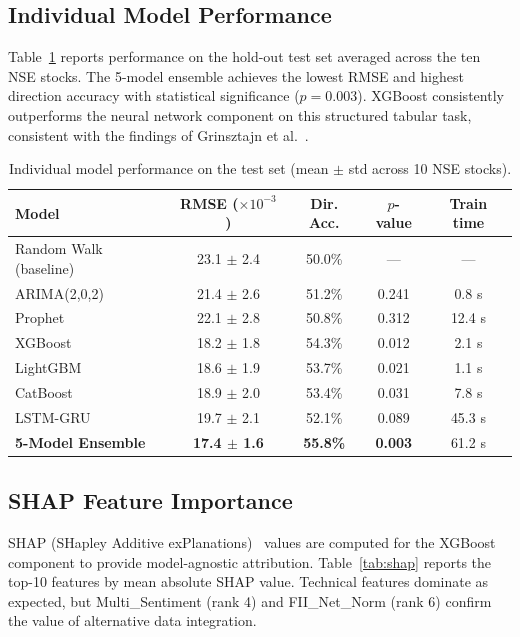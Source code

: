 \documentclass[10pt,a4paper,twoside]{article}
\begin{document}
\subsection{Individual Model Performance}

Table~\ref{tab:model_perf} reports performance on the hold-out test set averaged
across the ten NSE stocks. The 5-model ensemble achieves the lowest RMSE and
highest direction accuracy with statistical significance ($p = 0.003$). XGBoost
consistently outperforms the neural network component on this structured tabular
task, consistent with the findings of Grinsztajn et al.~\cite{grinsztajn2022}.

\begin{table}[htb]
  \begin{center}
    {\caption{Individual model performance on the test set (mean $\pm$ std across
    10 NSE stocks).}\label{tab:model_perf}}
    \begin{tabular}{|l|c|c|c|c|}
    \hline
    \textbf{Model} & \textbf{RMSE ($\times 10^{-3}$)} & \textbf{Dir. Acc.} & \textbf{$p$-value} & \textbf{Train time} \\
    \hline
    Random Walk (baseline) & 23.1 $\pm$ 2.4 & 50.0\% & --- & --- \\
    ARIMA(2,0,2) & 21.4 $\pm$ 2.6 & 51.2\% & 0.241 & 0.8 s \\
    Prophet & 22.1 $\pm$ 2.8 & 50.8\% & 0.312 & 12.4 s \\
    XGBoost & 18.2 $\pm$ 1.8 & 54.3\% & 0.012 & 2.1 s \\
    LightGBM & 18.6 $\pm$ 1.9 & 53.7\% & 0.021 & 1.1 s \\
    CatBoost & 18.9 $\pm$ 2.0 & 53.4\% & 0.031 & 7.8 s \\
    LSTM-GRU & 19.7 $\pm$ 2.1 & 52.1\% & 0.089 & 45.3 s \\
    \textbf{5-Model Ensemble} & \textbf{17.4 $\pm$ 1.6} & \textbf{55.8\%} & \textbf{0.003} & 61.2 s \\
    \hline
    \end{tabular}
  \end{center}
\end{table}

\subsection{SHAP Feature Importance}

SHAP (SHapley Additive exPlanations)~\cite{lundberg2017} values are computed
for the XGBoost component to provide model-agnostic attribution. Table~\ref{tab:shap}
reports the top-10 features by mean absolute SHAP value. Technical features
dominate as expected, but Multi\_Sentiment (rank 4) and FII\_Net\_Norm (rank 6)
confirm the value of alternative data integration.
\end{document}
